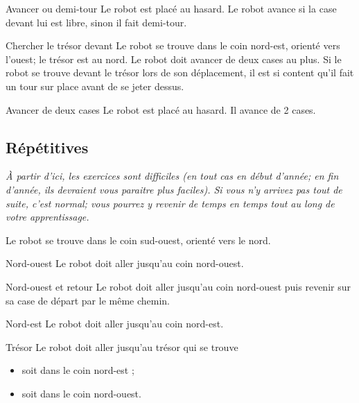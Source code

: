 \begin{Exercice}{Avancer ou demi-tour}
	Le robot est placé au hasard. 
	Le robot avance si la case devant lui est libre,
	sinon il fait demi-tour.
\end{Exercice}

\begin{Exercice}{Chercher le trésor devant}
	Le robot se trouve dans le coin nord-est, orienté vers
	l'ouest; le trésor est au nord. Le robot doit avancer
	de deux cases au plus. Si le robot se trouve devant le trésor lors de
	son déplacement, il est si content qu'il fait un tour
	sur place avant de se jeter dessus.
\end{Exercice}

\begin{Exercice}{Avancer de deux cases}
	Le robot est placé au hasard. Il avance de 2 cases.
\end{Exercice}


	\subsection{Répétitives}

		\emph{%
		À partir d'ici, les exercices sont difficiles
		(en tout cas en début d'année; en fin d'année,
		ils devraient vous paraitre plus faciles).
		Si vous n'y arrivez pas tout de suite, c'est normal; 
		vous pourrez y revenir de temps en temps 
		tout au long de votre apprentissage.
		}

		Le robot se trouve dans le coin sud-ouest, orienté vers le nord.

		\begin{Exercice}{Nord-ouest}
			Le robot doit aller jusqu'au coin nord-ouest.
		\end{Exercice}

		\begin{Exercice}{Nord-ouest et retour}
			Le robot doit aller jusqu'au coin nord-ouest
			puis revenir sur sa case de départ par le même chemin.
		\end{Exercice}

		\begin{Exercice}{Nord-est}
			Le robot doit aller jusqu'au coin nord-est.
		\end{Exercice}

		\begin{Exercice}{Trésor}
			Le robot doit aller jusqu'au trésor qui se trouve
			\begin{itemize}
			\item soit dans le coin nord-est ;
			\item soit dans le coin nord-ouest.
			\end{itemize}
		\end{Exercice}


